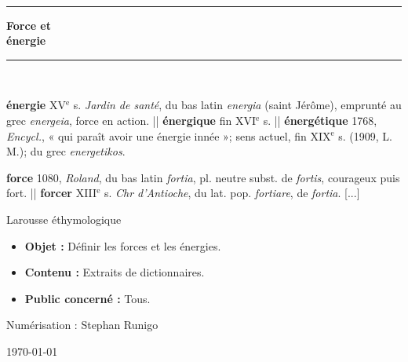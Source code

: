 \begin{titlepage}
%
\newcommand{\HRule}{\rule{\linewidth}{0.5mm}}

\begin{center}
\end{center}

\textsc{\Large }\\[0.5cm]

\HRule

\begin{center}
{\huge \bfseries  Force et\\
énergie\\[0.4cm] }
\end{center}

\HRule \\[1.5cm]


\vfill

\begin{minipage}{0.4\textwidth}
{\bf énergie }{\footnotesize XV}$^\text{e}$ s. {\it Jardin de santé}, du bas latin {\it energia} (saint Jérôme), emprunté au grec {\it energeia}, force en action. || {\bf énergique} fin {\footnotesize XVI}$^\text{e}$ s. || {\bf énergétique} 1768, {\it Encycl.}, « qui paraît avoir une énergie innée »; sens actuel, fin {\footnotesize XIX}$^\text{e}$ s. (1909, L. M.); du grec {\it energetikos}.
\end{minipage}
\hfill
\begin{minipage}{0.4\textwidth}
\begin{flushleft}
{\bf force} 1080, {\it Roland}, du bas latin {\it fortia}, pl. neutre subst. de {\it fortis}, courageux puis fort. || {\bf forcer} {\footnotesize XIII}$^\text{e}$ s. {\it Chr d'Antioche}, du lat. pop. {\it fortiare}, de {\it fortia}. [...]%
\end{flushleft}
\begin{flushright} \large
Larousse éthymologique
\end{flushright}
\end{minipage}

\vfill
{\sf \footnotesize
\begin{itemize}[leftmargin=1cm, label=, itemsep=1pt]
\item {\bf Objet : } Définir les forces et les énergies.
\item {\bf Contenu : } Extraits de dictionnaires.
\item {\bf Public concerné : } Tous.
\end{itemize}
}
\vfill

\begin{flushright}
Numérisation : Stephan Runigo
\end{flushright}
\vfill

{\large \today}

\end{titlepage}
